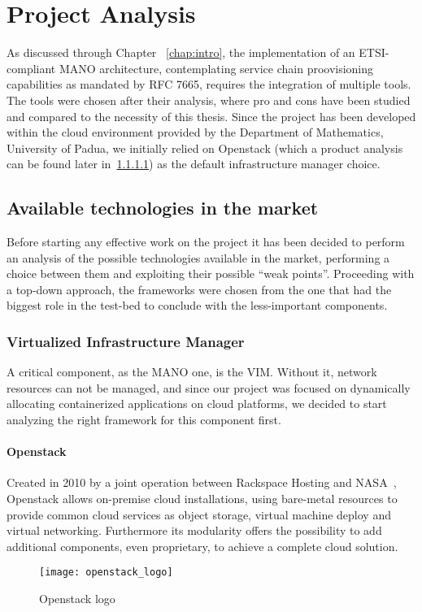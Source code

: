 \chapter{Project Analysis}
\label{chap:prjan}

As discussed through Chapter ~\ref{chap:intro}, the implementation of an
ETSI-compliant MANO architecture, contemplating service chain proovisioning
capabilities as mandated by RFC 7665, requires the integration of multiple
tools. The tools were chosen after their analysis, where pro and cons have been
studied and compared to the necessity of this thesis. Since the project has been
developed within the cloud environment provided by the Department of
Mathematics, University of Padua, we initially relied on Openstack (which a
product analysis can be found later in~\ref{chap:prjan:sec:openstack}) as the
default infrastructure manager choice.

\section{Available technologies in the market}
\label{chap:prjan:sec:tech}
Before starting any effective work on the project it has been decided to 
perform an analysis of the possible technologies available in the market, 
performing a choice between them and exploiting their possible ``weak 
points''. Proceeding with a top-down approach, the frameworks were chosen from 
the one that had the biggest role in the test-bed to conclude with the 
less-important components.

\subsection{Virtualized Infrastructure Manager}
A critical component, as the MANO one, is the VIM. Without it, network resources
can not be managed, and since our project was focused on dynamically allocating
containerized applications on cloud platforms, we decided to start analyzing the
right framework for this component first.

\subsubsection{Openstack}
\label{chap:prjan:sec:openstack}
Created in 2010 by a joint operation between Rackspace Hosting and
NASA~\cite{openstackWebsite}, Openstack allows on-premise cloud installations,
using bare-metal resources to provide common cloud services as object storage,
virtual machine deploy and virtual networking. Furthermore its modularity offers
the possibility to add additional components, even proprietary, to achieve a
complete cloud solution.
\begin{figure}[h]
 \centering \texttt{[image: openstack\_logo]}
 \caption{Openstack logo}
 \label{chap:prjan:img:openstack_logo}
\end{figure}

